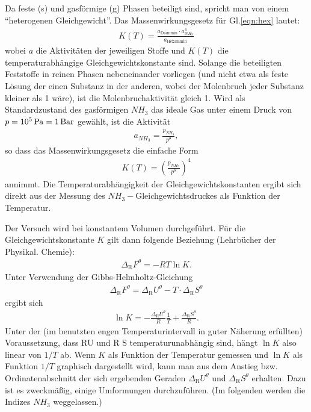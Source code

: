 \documentclass[english,twocolumn,DIV21,a4,10pt]{scrartcl}
\newcommand{\dr}{\Delta_\textrm{R}}
\begin{document}
Da feste (s) und gasförmige (g) Phasen beteiligt sind, spricht man von
einem ``heterogenen Gleichgewicht''.  Das Massenwirkungsgesetz für
Gl.\eqref{eqn:hex} lautet:
\begin{align}
  K(T) = \frac{a_\textrm{Diammin} \cdot a^4_{NH_3}}{a_\textrm{Hexammin}}
\end{align}
wobei $a$ die  Aktivit\"aten der
jeweiligen Stoffe und $K(T)$ die temperaturabhängige
Gleichgewichtskonstante sind. Solange die beteiligten Feststoffe in
reinen Phasen nebeneinander vorliegen (und nicht etwa als feste
L\"osung der einen Substanz in der anderen, wobei der Molenbruch jeder
Substanz kleiner als 1 w\"are), ist die Molenbruchaktivit\"at gleich
1.  Wird als Standardzustand des gasförmigen $NH_3$ das ideale Gas
unter einem Druck von $p = \unit[10^5]{Pa} = \unit[1]{Bar}$ gewählt,
ist die Aktivit\"at
\begin{align}
  a_{NH_3}=\frac{p_{NH_3}}{p^\theta},
\end{align}
so dass das Massenwirkungsgesetz die einfache Form
\begin{align}
  K(T)=\left(\frac{p_{NH_3}}{p^\theta}\right)^4
\end{align}
annimmt. Die Temperaturabhängigkeit der Gleichgewichtskonstanten
ergibt sich direkt aus der Messung des $NH_3-$Gleichgewichtsdruckes
als Funktion der Temperatur.

Der Versuch wird bei konstantem Volumen durchgeführt. Für die
Gleichgewichtskonstante $K$ gilt dann folgende Beziehung (Lehrbücher
der Physikal. Chemie):
\begin{align}
  \label{eqn:frei}
  \dr F^\theta = -RT\ln K.
\end{align}
Unter Verwendung der Gibbs-Helmholtz-Gleichung
\begin{align}
  \label{eqn:frei2}
  \dr F^\theta = \dr U^\theta - T \cdot \dr S^\theta
\end{align}
ergibt sich
\begin{align}
  \ln K = -\frac{\dr U^\theta}{R}\frac{1}{T} + \frac{\dr S^\theta}{R}.
\end{align}
Unter der (im benutzten engen Temperaturintervall in guter Näherung
erfüllten) Voraussetzung, dass RU und R S temperaturunabhängig sind,
hängt $\ln K$ also linear von $1/T$ ab. Wenn $K$ als Funktion der
Temperatur gemessen und $\ln K$ als Funktion $1/T$ graphisch
dargestellt wird, kann man aus dem Anstieg bzw. Ordinatenabschnitt der
sich ergebenden Geraden $\dr U^\theta$ und $\dr S^\theta$
erhalten. Dazu ist es zweckmäßig, einige Umformungen
durchzuführen. (Im folgenden werden die Indizes $NH_3$ weggelassen.)
\end{document}
